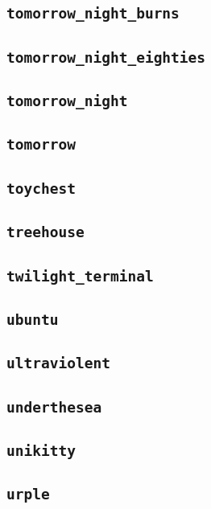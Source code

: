 \subsection{\texttt{tomorrow\_night\_burns}}
\newpage
\subsection{\texttt{tomorrow\_night\_eighties}}
\newpage
\subsection{\texttt{tomorrow\_night}}
\newpage
\subsection{\texttt{tomorrow}}
\newpage
\subsection{\texttt{toychest}}
\newpage
\subsection{\texttt{treehouse}}
\newpage
\subsection{\texttt{twilight\_terminal}}
\newpage
\subsection{\texttt{ubuntu}}
\newpage
\subsection{\texttt{ultraviolent}}
\newpage
\subsection{\texttt{underthesea}}
\newpage
\subsection{\texttt{unikitty}}
\newpage
\subsection{\texttt{urple}}
\newpage
